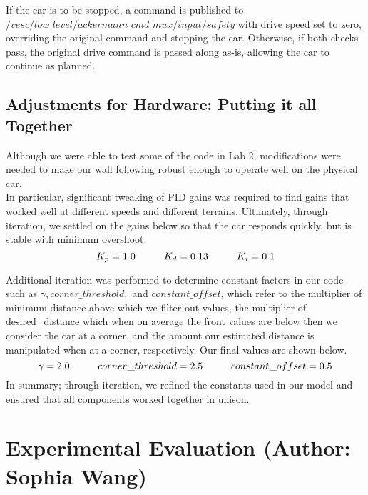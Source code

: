 \documentclass{article}
\begin{document}
If the car is to be stopped, a command is published to $/vesc/low\_level/ackermann\_cmd\_mux/input/safety$ with drive speed set to zero, overriding the original command and stopping the car. Otherwise, if both checks pass, the original drive command is passed along as-is, allowing the car to continue as planned.



\subsection{Adjustments for Hardware: Putting it all Together}
Although we were able to test some of the code in Lab 2, modifications were needed to make our wall following robust enough to operate well on the physical car. \\

In particular, significant tweaking of PID gains was required to find gains that worked well at different speeds and different terrains. Ultimately, through iteration, we settled on the gains below so that the car responds quickly, but is stable with minimum overshoot.
\begin{equation}
    K_p = 1.0\hspace{10mm} K_d = 0.13 \hspace{10mm} K_i = 0.1
\end{equation}


Additional iteration was performed to determine constant factors in our code such as $\gamma, corner\_threshold,$ and $constant\_offset$, which refer to the multiplier of minimum distance above which we filter out values, the multiplier of desired\_distance which when on average the front values are below then we consider the car at a corner, and the amount our estimated distance is manipulated when at a corner, respectively. Our final values are shown below.
\begin{equation}
    \gamma = 2.0 \hspace{10mm} corner\_threshold = 2.5 \hspace{10mm} constant\_offset = 0.5
\end{equation}
In summary; through iteration, we refined the constants used in our model and ensured that all components worked together in unison. 


\section{Experimental Evaluation (Author: Sophia Wang)}
\end{document}
